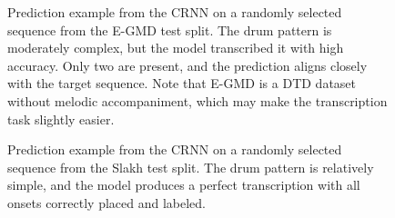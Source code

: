 \begin{figure}[H]
    \centering
    \caption{Prediction example from the \acrfull{CRNN} on a randomly selected sequence from the E-GMD test split. The drum pattern is moderately complex, but the model transcribed it with high accuracy. Only two  are present, and the prediction aligns closely with the target sequence. Note that E-GMD is a \gls{DTD} dataset without melodic accompaniment, which may make the transcription task slightly easier.}
    \label{ArchitecturePredictionComparisonEGMDFigure}
\end{figure}

\begin{figure}[H]
    \centering
    \caption{Prediction example from the \acrfull{CRNN} on a randomly selected sequence from the Slakh test split. The drum pattern is relatively simple, and the model produces a perfect transcription with all onsets correctly placed and labeled.}
    \label{ArchitecturePredictionComparisonSlakhFigure}
\end{figure}

